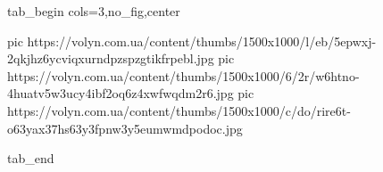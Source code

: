  
 
 
 
 


\ifcmt
  tab_begin cols=3,no_fig,center

     pic https://volyn.com.ua/content/thumbs/1500x1000/l/eb/5epwxj-2qkjhz6ycviqxurndpzspzgtikfrpebl.jpg
		 pic https://volyn.com.ua/content/thumbs/1500x1000/6/2r/w6htno-4huatv5w3ucy4ibf2oq6z4xwfwqdm2r6.jpg
		 pic https://volyn.com.ua/content/thumbs/1500x1000/c/do/rire6t-o63yax37hs63y3fpnw3y5eumwmdpodoc.jpg

  tab_end
\fi
